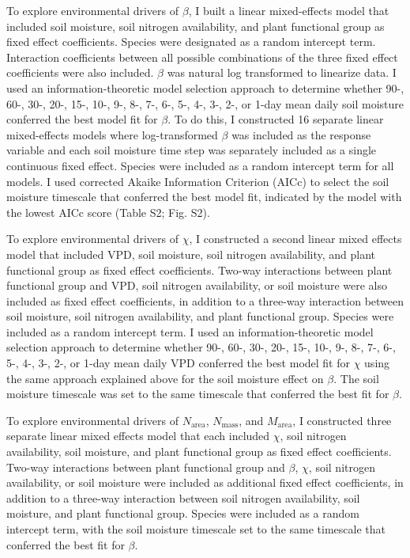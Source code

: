 To explore environmental drivers of $\beta$, I built a linear mixed-effects model that included soil moisture, soil nitrogen availability, and plant functional group as fixed effect coefficients. Species were designated as a random intercept term. Interaction coefficients between all possible combinations of the three fixed effect coefficients were also included. $\beta$ was natural log transformed to linearize data. I used an information-theoretic model selection approach to determine whether 90-, 60-, 30-, 20-, 15-, 10-, 9-, 8-, 7-, 6-, 5-, 4-, 3-, 2-, or 1-day mean daily soil moisture conferred the best model fit for $\beta$. To do this, I constructed 16 separate linear mixed-effects models where log-transformed $\beta$ was included as the response variable and each soil moisture time step was separately included as a single continuous fixed effect. Species were included as a random intercept term for all models. I used corrected Akaike Information Criterion (AICc) to select the soil moisture timescale that conferred the best model fit, indicated by the model with the lowest AICc score (Table S2; Fig. S2).

To explore environmental drivers of $\chi$, I constructed a second linear mixed effects model that included VPD, soil moisture, soil nitrogen availability, and plant functional group as fixed effect coefficients. Two-way interactions between plant functional group and VPD, soil nitrogen availability, or soil moisture were also included as fixed effect coefficients, in addition to a three-way interaction between soil moisture, soil nitrogen availability, and plant functional group. Species were included as a random intercept term. I used an information-theoretic model selection approach to determine whether 90-, 60-, 30-, 20-, 15-, 10-, 9-, 8-, 7-, 6-, 5-, 4-, 3-, 2-, or 1-day mean daily VPD conferred the best model fit for $\chi$ using the same approach explained above for the soil moisture effect on $\beta$. The soil moisture timescale was set to the same timescale that conferred the best fit for $\beta$.

To explore environmental drivers of $N_\mathrm{area}$, $N_\mathrm{mass}$, and $M_\mathrm{area}$, I constructed three separate linear mixed effects model that each included $\chi$, soil nitrogen availability, soil moisture, and plant functional group as fixed effect coefficients. Two-way interactions between plant functional group and $\beta$, $\chi$, soil nitrogen availability, or soil moisture were included as additional fixed effect coefficients, in addition to a three-way interaction between soil nitrogen availability, soil moisture, and plant functional group. Species were included as a random intercept term, with the soil moisture timescale set to the same timescale that conferred the best fit for $\beta$.

